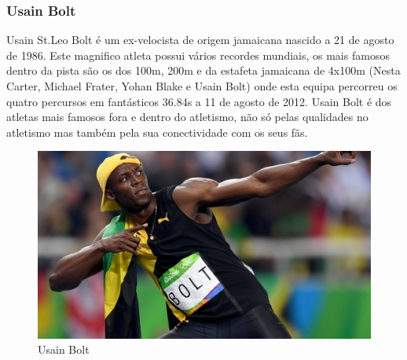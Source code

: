 \documentclass{report}
\begin{document}
        \subsubsection{Usain Bolt}
        Usain St.Leo Bolt é um ex-velocista de origem jamaicana nascido a 21 de agosto de 1986. Este magnifico atleta possui vários recordes mundiais, os mais famosos dentro da pista são os dos 100m, 200m e da estafeta jamaicana de 4x100m (Nesta Carter, Michael Frater, Yohan Blake e Usain Bolt) onde esta equipa percorreu os quatro percursos em fantásticos 36.84s a 11 de agosto de 2012. Usain Bolt é dos atletas mais famosos fora e dentro do atletismo, não só pelas qualidades no atletismo mas também pela sua conectividade com os seus fãs. \cite{bolt}
         \FloatBarrier
            \begin{figure}[h]
            \center
            \includegraphics[scale=.14,angle=0]{bolt.jpg}
            \caption{Usain Bolt}
            \label{fig:Bolt.2}
            \end{figure}
        \FloatBarrier
        
\end{document}
